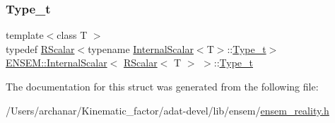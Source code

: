 \subsubsection{\texorpdfstring{Type\_t}{Type\_t}\hspace{0.1cm}{\footnotesize\ttfamily [3/3]}}
{\footnotesize\ttfamily template$<$class T $>$ \\
typedef \mbox{\hyperlink{classENSEM_1_1RScalar}{R\+Scalar}}$<$typename \mbox{\hyperlink{structENSEM_1_1InternalScalar}{Internal\+Scalar}}$<$T$>$\+::\mbox{\hyperlink{structENSEM_1_1InternalScalar_3_01RScalar_3_01T_01_4_01_4_a2acb8111a19ee425e0751d1355d5151e}{Type\+\_\+t}}$>$ \mbox{\hyperlink{structENSEM_1_1InternalScalar}{E\+N\+S\+E\+M\+::\+Internal\+Scalar}}$<$ \mbox{\hyperlink{classENSEM_1_1RScalar}{R\+Scalar}}$<$ T $>$ $>$\+::\mbox{\hyperlink{structENSEM_1_1InternalScalar_3_01RScalar_3_01T_01_4_01_4_a2acb8111a19ee425e0751d1355d5151e}{Type\+\_\+t}}}



The documentation for this struct was generated from the following file\+:\begin{DoxyCompactItemize}
\item 
/\+Users/archanar/\+Kinematic\+\_\+factor/adat-\/devel/lib/ensem/\mbox{\hyperlink{adat-devel_2lib_2ensem_2ensem__reality_8h}{ensem\+\_\+reality.\+h}}\end{DoxyCompactItemize}
